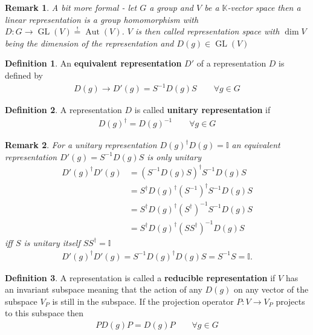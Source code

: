 \documentclass[10pt,a4paper]{book}
\newtheorem{remark}{Remark}[section]
\theoremstyle{definition}
\newtheorem{definition}{Definition}[section]
\DeclareMathOperator{\Aut}{Aut}
\DeclareMathOperator{\GL}{GL}
\begin{document}
\begin{remark}{}
A bit more formal - let $G$ a group and $V$ be a $\mathbb{K}$-vector space then a linear representation is a group homomorphism with
$D:G\rightarrow \GL(V)\overset{!}{=}\Aut(V)$. $V$ is then called representation space with $\dim V$ being the dimension of the representation and $D(g)\in\GL(V)$
\end{remark}

\begin{definition}{}
An {\bf equivalent representation} $D'$ of a representation $D$ is defined by 
\begin{align}
D(g)\rightarrow D'(g)=S^{-1}D(g)S   \qquad \forall g\in G
\end{align}
\end{definition}

\begin{definition}{}
A representation $D$ is called {\bf unitary representation} if 
\begin{align}
D(g)^\dagger=D(g)^{-1}    \qquad \forall g\in G
\end{align}
\end{definition}

\begin{remark}{}
For a unitary representation $D(g)^\dagger D(g)=\mathbb{I}$ an equivalent representation $D'(g)=S^{-1}D(g)S$ is only unitary
\begin{align}
    D'(g)^\dagger D'(g)&=\left(S^{-1}D(g)S\right)^\dagger S^{-1}D(g)S\\
    &=S^\dagger D(g)^\dagger (S^{-1})^\dagger S^{-1}D(g)S\\
    &=S^\dagger D(g)^\dagger (S^\dagger)^{-1} S^{-1}D(g)S\\
    &=S^\dagger D(g)^\dagger (SS^\dagger)^{-1} D(g)S
\end{align}
iff $S$ is unitary itself $SS^\dagger = \mathbb{I}$
\begin{align}
    D'(g)^\dagger D'(g)=S^{-1} D(g)^\dagger D(g)S = S^{-1} S = \mathbb{I}.
\end{align}
\end{remark}

\begin{definition}{}
A representation is called a {\bf reducible representation} if $V$ has an invariant subspace meaning that the action of any $D(g)$ on any vector of the subspace $V_P$ is still in the subspace. If the projection operator $P:V\rightarrow V_P$ projects to this subspace then
\begin{align}
PD(g)P=D(g)P   \qquad \forall g\in G
\end{align}
\end{definition}
\end{document}
